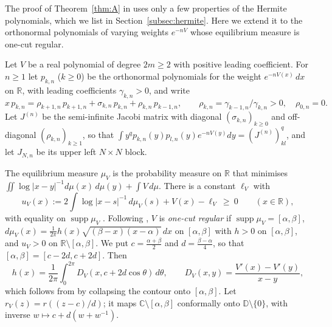 \documentclass[11pt]{amsart}
\theoremstyle{definition}
\theoremstyle{remark}
\numberwithin{equation}{section}
\newcommand{\C}{\mathbb{C}}
\newcommand{\R}{\mathbb{R}}
\newcommand{\D}{\mathbb{D}}
\begin{document}
The proof of Theorem~\ref{thm:A} in \cite[Sections~{\ref{M-sec:prelim}}--{\ref{M-sec:proof}}]{Main} uses only a few properties of the Hermite polynomials, which we list in Section~\ref{subsec:hermite}. Here we extend it to the orthonormal polynomials of varying weights $e^{-nV}$ whose equilibrium measure is one-cut regular.

Let $V$ be a real polynomial of degree $2m\ge2$ with positive leading coefficient. For $n\ge1$ let $p_{k,n}$ ($k\ge0$) be the orthonormal polynomials for the weight $e^{-nV(x)}\,dx$ on $\R$, with leading coefficients $\gamma_{k,n}>0$, and write
\begin{equation}\label{eq:vrec}
x\,p_{k,n}=\rho_{k+1,n}\,p_{k+1,n}+\sigma_{k,n}\,p_{k,n}+\rho_{k,n}\,p_{k-1,n},\qquad\rho_{k,n}=\gamma_{k-1,n}/\gamma_{k,n}>0,\quad\rho_{0,n}=0 .
\end{equation}
Let $J^{(n)}$ be the semi-infinite Jacobi matrix with diagonal $(\sigma_{k,n})_{k\ge0}$ and off-diagonal $(\rho_{k,n})_{k\ge1}$, so that $\int y^qp_{k,n}(y)p_{l,n}(y)e^{-nV(y)}dy=(J^{(n)})^q_{kl}$, and let $J_{N,n}$ be its upper left $N\times N$ block.

The equilibrium measure $\mu_V$ is the probability measure on $\R$ that minimises $\iint\log|x-y|^{-1}d\mu(x)\,d\mu(y)+\int V\,d\mu$. There is a constant $\ell_V$ with
\begin{equation}\label{eq:vEL}
u_V(x):=2\int\log|x-s|^{-1}\,d\mu_V(s)+V(x)-\ell_V\ \ge\ 0\qquad(x\in\R),
\end{equation}
with equality on $\operatorname{supp}\mu_V$ \cite[Theorem~I.1.3]{SaTo}. Following \cite[\S4]{BI}, $V$ is \emph{one-cut regular} if $\operatorname{supp}\mu_V=[\alpha,\beta]$, $d\mu_V(x)=\frac1{2\pi}h(x)\sqrt{(\beta-x)(x-\alpha)}\,dx$ on $[\alpha,\beta]$ with $h>0$ on $[\alpha,\beta]$, and $u_V>0$ on $\R\setminus[\alpha,\beta]$. We put $c=\frac{\alpha+\beta}2$ and $d=\frac{\beta-\alpha}4$, so that $[\alpha,\beta]=[c-2d,c+2d]$. Then
\begin{equation}\label{eq:vh}
h(x)=\frac1{2\pi}\int_0^{2\pi}D_V(x,c+2d\cos\theta)\,d\theta,\qquad D_V(x,y)=\frac{V'(x)-V'(y)}{x-y},
\end{equation}
which follows from \cite[(4.12)]{BI} by collapsing the contour onto $[\alpha,\beta]$.
Let $r_V(z)=r((z-c)/d)$; it maps $\C\setminus[\alpha,\beta]$ conformally onto $\D\setminus\{0\}$, with inverse $w\mapsto c+d(w+w^{-1})$.
\end{document}
